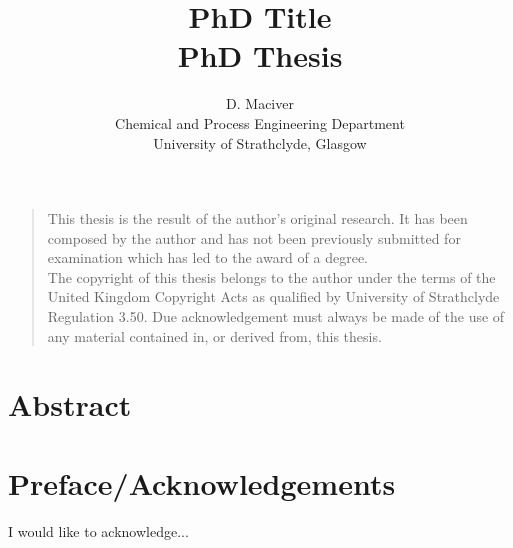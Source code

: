 \documentclass[a4paper,oneside,11pt]{book}
\title{PhD Title \\ PhD Thesis}
\author{D. Maciver\\[-0.8ex]
\small Chemical and Process Engineering Department\\[-0.8ex]
\small University of Strathclyde, Glasgow\\}
\begin{document}
\maketitle


\frontmatter

\vspace*{\fill}
\noindent
\begin{quote}
	\centering
	This thesis is the result of the author's original research. It has been composed by the author and has not been previously submitted for examination which has led to the award of a degree. \\[5pt]
	The copyright of this thesis belongs to the author under the terms of the United Kingdom Copyright Acts as qualified by University of Strathclyde Regulation 3.50. Due acknowledgement must always be made of the use of any material contained in, or derived from, this thesis. \\[5pt]
\end{quote}
\vspace*{\fill}



\chapter{Abstract}



\tableofcontents

\listoffigures

\listoftables



\chapter{Preface/Acknowledgements}
I would like to acknowledge... 



\mainmatter







\end{document}

